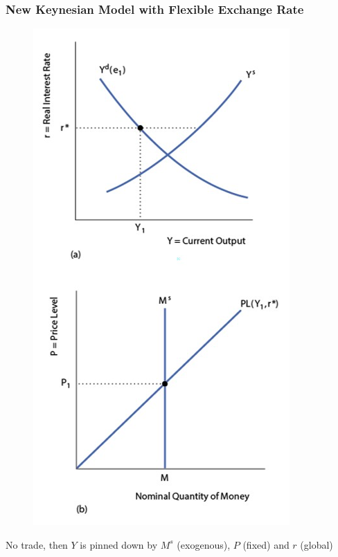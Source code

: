 \documentclass{beamer}
\begin{document}
\begin{frame}
\frametitle[alignment=center]{New Keynesian Model with Flexible Exchange Rate}
\begin{figure}
\centering
\includegraphics[scale=0.55]{Figures/W_Fig_17pt13.png}
\end{figure}
No trade, then $Y$ is pinned down by $M^s$ (exogenous), $P$ (fixed) and $r$ (global)
\end{frame}
\end{document}

